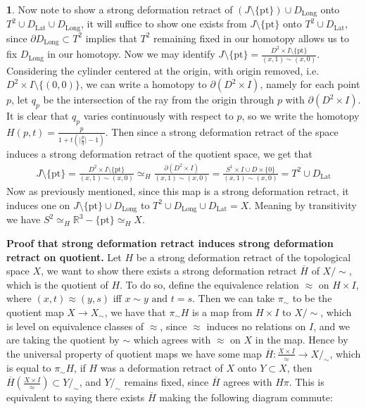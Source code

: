\documentclass[10.5pt]{article}
\theoremstyle{definition}
\newtheorem{pb}{}
\newcommand{\set}[1]{\{#1\}}
\newcommand{\abs}[1]{\lvert#1\rvert}
\newcommand{\tand}{\text{ and }}
\newcommand{\ism}{\simeq}
\begin{document}
\begin{pb}
        Now note to show a strong deformation retract of \((J \setminus \set{\text{pt}}) \cup D_\text{Long}\) onto \(T^2 \cup D_\text{Lat} \cup D_\text{Long}\), it will suffice to show one
        exists from \(J \setminus \set{\text{pt}}\) onto \(T^2 \cup D_\text{Lat}\), since \(\partial D_\text{Long} \subset T^2\) 
        implies that \(T^2\) remaining fixed in our homotopy allows us to fix
        \(D_\text{Long}\) in our homotopy. Now we may identify \(J \setminus \set{\text{pt}} = \frac{D^2 \times I \setminus \set{\text{pt}}}{(x,1) \sim (x,0)}\). 
        Considering the cylinder centered at the origin, with origin removed, i.e. \(D^2 \times I \setminus \set{(0,0)}\), we can write a homotopy to
        \(\partial(D^2 \times I)\), namely for each point \(p\), let \(q_p\) be the intersection of the ray from the origin through \(p\) with \(\partial(D^2 \times I)\).
        It is clear that \(q_p\) varies continuously with respect to \(p\), so we write the homotopy \(H(p,t) = \frac{p}{1 + t(\abs{\frac{p}{q}} - 1)}\).
        Then since a strong deformation retract of the space induces a strong deformation retract of the quotient space, we get that
        \begin{align*}
            J \setminus \set{\text{pt}} = \frac{D^2 \times I \setminus \set{\text{pt}}}{(x,1) \sim (x,0)} \ism_H \frac{\partial (D^2 \times I)}{(x,1) \sim (x,0)}
            = \frac{S^1 \times I \cup D \times \set{0}}{(x,1) \sim (x,0)} = T^2 \cup D_{\text{Lat}}
        \end{align*}
        Now as previously mentioned, since this map is a strong deformation retract, it induces one on \(J\setminus\set{\text{pt}}\cup D_\text{Long}\) to
        \(T^2 \cup D_\text{Long} \cup D_\text{Lat} = X\). Meaning by transitivity we have \(S^2 \ism_H \mathbb{R}^3 - \set{\text{pt}} \ism_H X\).

        \textbf{Proof that strong deformation retract induces strong deformation retract on quotient.}
        Let \(H\) be a strong deformation retract of the topological space \(X\), we want to show there exists a strong deformation retract
        \(\overline{H}\) of \(X/\sim\), which is the quotient of \(H \). To do so, define the equivalence relation \(\approx\) on \(H \times I \), where
        \((x,t) \approx (y,s)\) iff \(x \sim y \tand t = s\). Then we can take \(\pi_\sim\) to be the quotient map \(X \to X_\sim\), we have that
        \(\pi_\sim H\) is a map from \(H \times I\) to \(X/\sim \), which is level on equivalence classes of \(\approx\), since \(\approx\) induces no relations on
        \(I\), and we are taking the quotient by \(\sim\) which agrees with \(\approx\) on \(X\) in the map. Hence by the universal property of quotient maps we have some map 
        \(\overline{H}: \frac{X \times I }{\approx} \to X/_\sim\), which is equal to \(\pi_\sim H\), if \(H\) was a deformation retract of \(X\) onto
        \(Y \subset X\), then \(\overline{H} (\frac{X \times I }{\approx}) \subset Y/_\sim\), and \(Y/_\sim\) remains fixed, since \(\overline{H}\) agrees with \(H\pi\). This is equivalent
        to saying there exists \(\overline{H}\) making the following diagram commute:
        

\end{pb}
\end{document}
